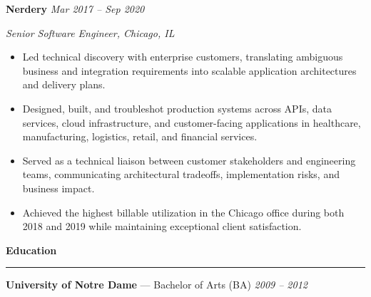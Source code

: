 \documentclass[letterpaper,9pt]{extarticle}
\newcommand{\resheading}[1]{
  \vspace{15pt}
  \textbf{\large #1}
  \vspace{5pt}
  \hrule
  \vspace{10pt}
}
\newcommand{\roleheading}[3]{
  \Needspace{6\baselineskip}
  \textbf{#1}
  \hfill
  \textit{#2}

  \emph{#3}
}
\begin{document}
\roleheading
  {Nerdery}
  {Mar 2017 -- Sep 2020}
  {Senior Software Engineer, Chicago, IL}

\begin{itemize}
\item Led technical discovery with enterprise customers, translating ambiguous business and integration requirements into scalable application architectures and delivery plans.
\item Designed, built, and troubleshot production systems across APIs, data services, cloud infrastructure, and customer-facing applications in healthcare, manufacturing, logistics, retail, and financial services.
\item Served as a technical liaison between customer stakeholders and engineering teams, communicating architectural tradeoffs, implementation risks, and business impact.
\item Achieved the highest billable utilization in the Chicago office during both 2018 and 2019 while maintaining exceptional client satisfaction.
\end{itemize}

\resheading{Education}

\textbf{University of Notre Dame} --- Bachelor of Arts (BA)
\hfill
\textit{2009 -- 2012}
\end{document}

